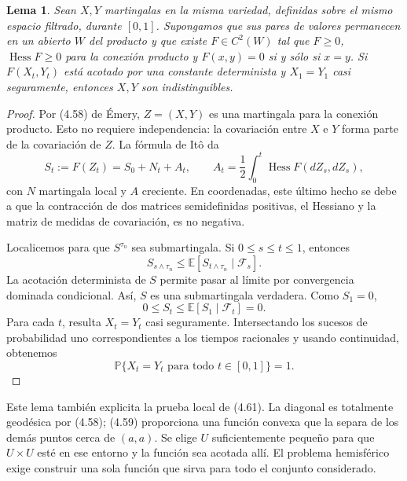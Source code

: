 \documentclass[11pt,a4paper]{article}
\newtheorem{lemma}{Lema}
\newcommand{\E}{\mathbb E}
\newcommand{\PP}{\mathbb P}
\DeclareMathOperator{\Hess}{Hess}
\begin{document}
\begin{lemma}\label{lem:separation}
Sean $X,Y$ martingalas en la misma variedad, definidas sobre el mismo espacio filtrado, durante $[0,1]$. Supongamos que sus pares de valores permanecen en un abierto $W$ del producto y que existe $F\in C^2(W)$ tal que $F\geq0$, $\Hess F\geq0$ para la conexión producto y $F(x,y)=0$ si y sólo si $x=y$. Si $F(X_t,Y_t)$ está acotado por una constante determinista y $X_1=Y_1$ casi seguramente, entonces $X,Y$ son indistinguibles.
\end{lemma}
\begin{proof}
Por (4.58) de Émery, $Z=(X,Y)$ es una martingala para la conexión producto. Esto no requiere independencia: la covariación entre $X$ e $Y$ forma parte de la covariación de $Z$. La fórmula de Itô da
\[
 S_t:=F(Z_t)=S_0+N_t+A_t,\qquad
 A_t=\frac12\int_0^t\Hess F(dZ_s,dZ_s),
\]
con $N$ martingala local y $A$ creciente. En coordenadas, este último hecho se debe a que la contracción de dos matrices semidefinidas positivas, el Hessiano y la matriz de medidas de covariación, es no negativa.

Localicemos para que $S^{\tau_n}$ sea submartingala. Si $0\leq s\leq t\leq1$, entonces
\[
 S_{s\wedge\tau_n}\leq
 \E[S_{t\wedge\tau_n}\mid\mathcal F_s].
\]
La acotación determinista de $S$ permite pasar al límite por convergencia dominada condicional. Así, $S$ es una submartingala verdadera. Como $S_1=0$,
\[
 0\leq S_t\leq\E[S_1\mid\mathcal F_t]=0.
\]
Para cada $t$, resulta $X_t=Y_t$ casi seguramente. Intersectando los sucesos de probabilidad uno correspondientes a los tiempos racionales y usando continuidad, obtenemos
\[
 \PP\{X_t=Y_t\text{ para todo }t\in[0,1]\}=1.
\]
\end{proof}

Este lema también explicita la prueba local de (4.61). La diagonal es totalmente geodésica por (4.58); (4.59) proporciona una función convexa que la separa de los demás puntos cerca de $(a,a)$. Se elige $U$ suficientemente pequeño para que $U\times U$ esté en ese entorno y la función sea acotada allí. El problema hemisférico exige construir una sola función que sirva para todo el conjunto considerado.
\end{document}
